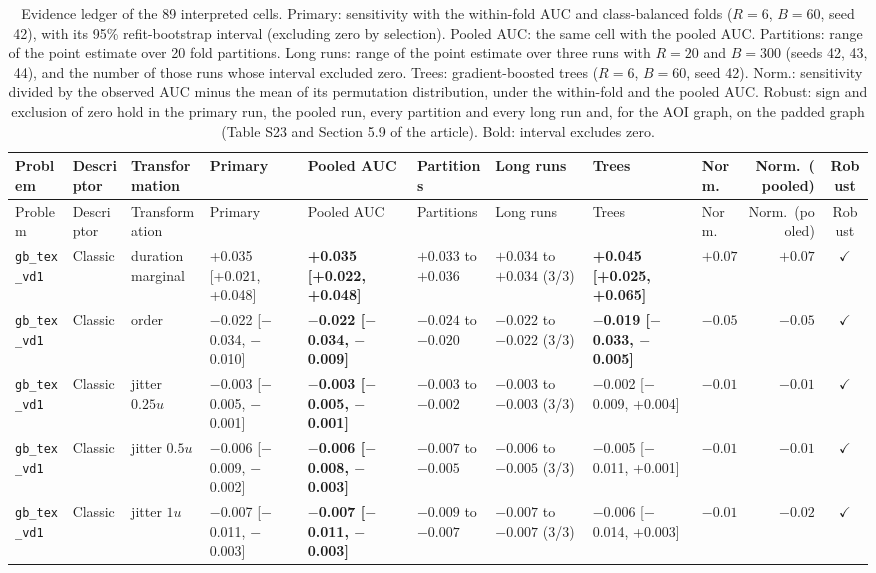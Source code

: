 \begin{longtable}{lllllllllrc}
\caption{Evidence ledger of the 89 interpreted cells. Primary: sensitivity with the within-fold AUC and class-balanced folds ($R = 6$, $B = 60$, seed 42), with its 95\% refit-bootstrap interval (excluding zero by selection). Pooled AUC: the same cell with the pooled AUC. Partitions: range of the point estimate over 20 fold partitions. Long runs: range of the point estimate over three runs with $R = 20$ and $B = 300$ (seeds 42, 43, 44), and the number of those runs whose interval excluded zero. Trees: gradient-boosted trees ($R = 6$, $B = 60$, seed 42). Norm.: sensitivity divided by the observed AUC minus the mean of its permutation distribution, under the within-fold and the pooled AUC. Robust: sign and exclusion of zero hold in the primary run, the pooled run, every partition and every long run and, for the AOI graph, on the padded graph (Table S23 and Section 5.9 of the article). Bold: interval excludes zero.}\\
\toprule
Problem & Descriptor & Transformation & Primary & Pooled AUC & Partitions & Long runs & Trees & Norm. & Norm.\ (pooled) & Robust \\
\midrule
\endfirsthead
\toprule
Problem & Descriptor & Transformation & Primary & Pooled AUC & Partitions & Long runs & Trees & Norm. & Norm.\ (pooled) & Robust \\
\midrule
\endhead
\bottomrule
\endfoot
\texttt{gb\_tex\_vd1} & Classic & duration marginal & +0.035 [+0.021, +0.048] & \textbf{+0.035 [+0.022, +0.048]} & $+0.033$ to $+0.036$ & $+0.034$ to $+0.034$ (3/3) & \textbf{+0.045 [+0.025, +0.065]} & $+0.07$ & $+0.07$ & $\checkmark$ \\
\texttt{gb\_tex\_vd1} & Classic & order & $-$0.022 [$-$0.034, $-$0.010] & \textbf{$-$0.022 [$-$0.034, $-$0.009]} & $-0.024$ to $-0.020$ & $-0.022$ to $-0.022$ (3/3) & \textbf{$-$0.019 [$-$0.033, $-$0.005]} & $-0.05$ & $-0.05$ & $\checkmark$ \\
\texttt{gb\_tex\_vd1} & Classic & jitter $0.25u$ & $-$0.003 [$-$0.005, $-$0.001] & \textbf{$-$0.003 [$-$0.005, $-$0.001]} & $-0.003$ to $-0.002$ & $-0.003$ to $-0.003$ (3/3) & $-$0.002 [$-$0.009, +0.004] & $-0.01$ & $-0.01$ & $\checkmark$ \\
\texttt{gb\_tex\_vd1} & Classic & jitter $0.5u$ & $-$0.006 [$-$0.009, $-$0.002] & \textbf{$-$0.006 [$-$0.008, $-$0.003]} & $-0.007$ to $-0.005$ & $-0.006$ to $-0.005$ (3/3) & $-$0.005 [$-$0.011, +0.001] & $-0.01$ & $-0.01$ & $\checkmark$ \\
\texttt{gb\_tex\_vd1} & Classic & jitter $1u$ & $-$0.007 [$-$0.011, $-$0.003] & \textbf{$-$0.007 [$-$0.011, $-$0.003]} & $-0.009$ to $-0.007$ & $-0.007$ to $-0.007$ (3/3) & $-$0.006 [$-$0.014, +0.003] & $-0.01$ & $-0.02$ & $\checkmark$ \\

\end{longtable}
